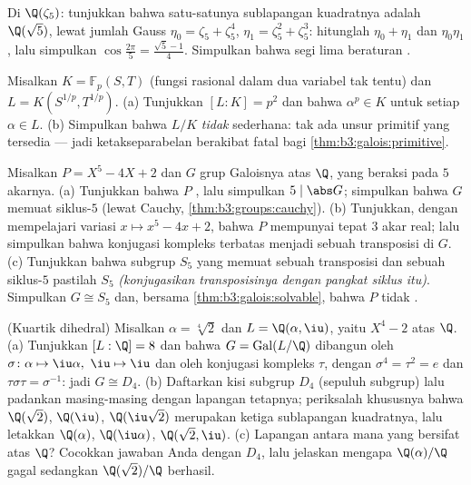 \begin{exercise}[$\star\star$]\label{exo:b3:galois:9}
Di $\Q(\zeta_5)$: tunjukkan bahwa satu-satunya sublapangan kuadratnya adalah
$\Q(\sqrt5)$, lewat jumlah Gauss $\eta_0 = \zeta_5 + \zeta_5^4$,
$\eta_1 = \zeta_5^2 + \zeta_5^3$: hitunglah $\eta_0 + \eta_1$ dan
$\eta_0\eta_1$, lalu simpulkan $\cos\frac{2\pi}5 = \frac{\sqrt5 -
1}4$. Simpulkan bahwa segi lima beraturan .
\end{exercise}

\begin{exercise}[$\star\star\star$]\label{exo:b3:galois:10}
Misalkan $K = \mathbb F_p(S, T)$ (fungsi rasional dalam dua
variabel tak tentu) dan $L = K(S^{1/p}, T^{1/p})$.
(a) Tunjukkan $[L:K] = p^2$ dan bahwa $\alpha^p \in K$ untuk setiap
$\alpha \in L$.
(b) Simpulkan bahwa $L/K$ \emph{tidak} sederhana: tak ada unsur primitif
yang tersedia --- jadi ketakseparabelan berakibat fatal bagi
\cref{thm:b3:galois:primitive}.
\end{exercise}

\begin{exercise}[$\star\star\star$]\label{exo:b3:galois:11}
Misalkan $P = X^5 - 4X + 2$ dan $G$ grup Galoisnya atas $\Q$,
yang beraksi pada $5$ akarnya.
(a) Tunjukkan bahwa $P$ , lalu simpulkan $5 \mid \abs G$; simpulkan
bahwa $G$ memuat siklus-$5$ (lewat Cauchy,
\cref{thm:b3:groups:cauchy}).
(b) Tunjukkan, dengan mempelajari variasi $x \mapsto x^5 - 4x +
2$, bahwa $P$ mempunyai tepat $3$ akar real; lalu simpulkan bahwa
konjugasi kompleks terbatas menjadi sebuah transposisi di $G$.
(c) Tunjukkan bahwa subgrup $S_5$ yang memuat sebuah transposisi dan
sebuah siklus-$5$ pastilah $S_5$ \emph{(konjugasikan transposisinya dengan
pangkat siklus itu)}. Simpulkan $G \cong S_5$ dan, bersama
\cref{thm:b3:galois:solvable}, bahwa $P$ tidak .
\end{exercise}

\begin{exercise}[$\star\star\star$]\label{exo:b3:galois:12}
(Kuartik dihedral) Misalkan $\alpha = \sqrt[4]2$ dan $L =
\Q(\alpha, \iu)$, yaitu  $X^4 - 2$ atas $\Q$.
(a) Tunjukkan $[L : \Q] = 8$ dan bahwa $G =
\operatorname{Gal}(L/\Q)$ dibangun oleh $\sigma\colon
\alpha \mapsto \iu\alpha,\ \iu \mapsto \iu$ dan oleh konjugasi
kompleks $\tau$, dengan $\sigma^4 = \tau^2 = e$ dan
$\tau\sigma\tau = \sigma^{-1}$: jadi $G \cong D_4$.
(b) Daftarkan kisi subgrup $D_4$ (sepuluh subgrup) lalu
padankan masing-masing dengan lapangan tetapnya; periksalah khususnya bahwa
$\Q(\sqrt2)$, $\Q(\iu)$, $\Q(\iu\sqrt2)$ merupakan ketiga
sublapangan kuadratnya, lalu letakkan $\Q(\alpha)$,
$\Q(\iu\alpha)$, $\Q(\sqrt2, \iu)$.
(c) Lapangan antara mana yang bersifat  atas $\Q$? Cocokkan
jawaban Anda dengan  $D_4$, lalu
jelaskan mengapa $\Q(\alpha)/\Q$ gagal sedangkan $\Q(\sqrt2)/\Q$
berhasil.
\end{exercise}

